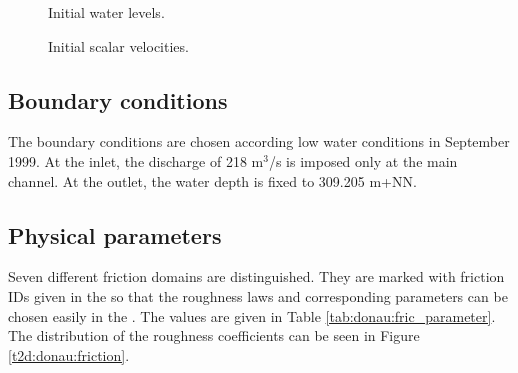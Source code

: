 \begin{figure} [h!]
\centering
{}
\caption{Initial water levels.}
\label{t2d:donau:free_surface0}
\end{figure}

\begin{figure} [h!]
\centering
{}
\caption{Initial scalar velocities.}
\label{t2d:donau:ini_flow}
\end{figure}

\subsection{Boundary conditions}
The boundary conditions are chosen according low water conditions in September 1999.
At the inlet, the discharge of 218 m$^3$/s is imposed only at the main channel.
At the outlet, the water depth is fixed to 309.205 m+NN.



\subsection{Physical parameters}
Seven different friction domains are distinguished.
They are marked with friction IDs given in the  so that the
roughness laws and corresponding parameters can be chosen easily in the
.
The values are given in Table \ref{tab:donau:fric_parameter}.
The distribution of the roughness coefficients can be seen in Figure
\ref{t2d:donau:friction}.

\begin{table}[H]
\caption{Friction law and parameter for the different friction domains.}
\label{tab:donau:fric_parameter}
\end{table}

